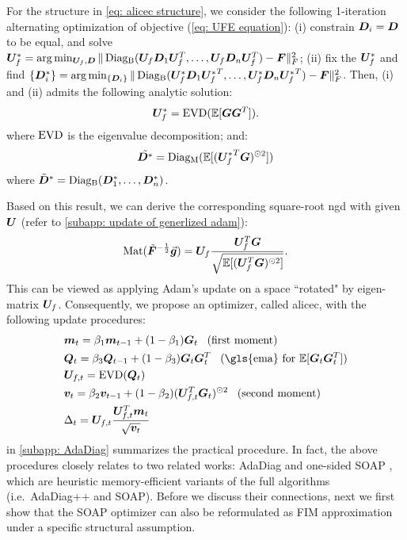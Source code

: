 \begin{theorem}
    For the structure in \cref{eq: alicec structure}, we consider the following 1-iteration alternating optimization of objective (\ref{eq: UFE equation}): (i) constrain ${\bm{D}}_i={\bm{D}}$ to be equal, and solve ${\bm{U}}_{f}^* = \arg \min_{{\bm{U}}_{f},{\bm{D}}} \Vert\operatorname{Diag_B}({\bm{U}}_{f}{\bm{D}}_1{\bm{U}}_{f}^T, \ldots, {\bm{U}}_{f}{\bm{D}}_n {\bm{U}}_{f}^T) -\bm{F}\Vert_F^2 $; (ii) fix the ${\bm{U}}_{f}^*$ and find $\{{\bm{D}}_i^*\} = \arg \min_{\{{\bm{D}}_i\}} \Vert\operatorname{Diag_B}({\bm{U}}_{f}^*{\bm{D}}_1{{\bm{U}}_{f}^*}^T, \ldots, {\bm{U}}_{f}^*{\bm{D}}_n {{\bm{U}}_{f}^*}^T) -\bm{F}\Vert_F^2$. Then, (i) and (ii) admits the following analytic solution:
    \begin{equation}
        {\bm{U}}_{f}^* = \operatorname{EVD}(\mathbb{E}[{\bm{G}}{\bm{G}}^T]).
    \end{equation}
    where $\operatorname{EVD}$ is the eigenvalue decomposition; and: 
    \begin{equation}
        \tilde{{\bm{D}}^*} = \operatorname{Diag_M}(\mathbb{E}[({{\bm{U}}_{f}^*}^T{\bm{G}})^{\odot 2}])
    \end{equation}
    where $\tilde{{\bm{D}}}^* = \operatorname{Diag_B}({\bm{D}}_1^*,\ldots,{\bm{D}}_n^*)$. 
    \label{thm: alicec 1 step refinement}
\end{theorem}
Based on this result, we can derive the corresponding square-root \gls{ngd} with given ${\bm{U}}$ (refer to \cref{subapp: update of generlized adam}):
\begin{equation}
    \operatorname{Mat}(\tilde{\bm{F}}^{-\frac{1}{2}}\vec{\bm{g}}) = {\bm{U}}_{f}\frac{{\bm{U}}_{f}^T{\bm{G}}}{\sqrt{\mathbb{E}[({\bm{U}}_{f}^T{\bm{G}})^{\odot 2}]}}.
    \label{eq: alicec update}
\end{equation}
This can be viewed as applying Adam's update on a space ``rotated" by eigen-matrix ${\bm{U}}_{f}$.
Consequently, we propose an optimizer, called \gls{alicec}, with the following update procedures:
\begin{align}
    &\vm_{t} = \beta_1\vm_{t-1}+(1-\beta_1)\mG_t\;\;\; (\text{first moment})\nonumber\\
    &\mQ_{t} = \beta_3\mQ_{t-1}+(1-\beta_3)\mG_t\mG_t^T\;\;\;(\text{\gls{ema} for }\E[\mG_t\mG_t^T])\nonumber\\
    & \mU_{f,t} = \eig(\mQ_{t})\nonumber\\
    & \vv_t = \beta_2\vv_{t-1}+(1-\beta_2)(\mU_{f,t}^T\mG_t)\elesquare\;\;\;(\text{second moment})\nonumber\\
    &\Delta_t = \mU_{f,t}\frac{\mU_{f,t}^T\vm_{t}}{\sqrt{\vv_t}}
\label{eq: practical alicec equations}    
\end{align}
 in \cref{subapp: AdaDiag} summarizes the practical procedure. 
In fact, the above procedures closely relates to two related works: AdaDiag and one-sided SOAP \citep{anonymous2024improving, vyas2024soap}, which are heuristic memory-efficient variants of the full algorithms (i.e.~AdaDiag++ and SOAP). Before we discuss their connections, next we first show that the SOAP optimizer can also be reformulated as FIM approximation under a specific structural assumption.


